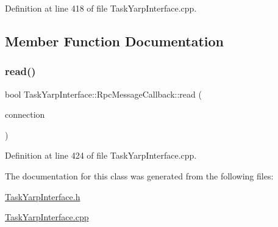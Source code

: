Definition at line 418 of file Task\+Yarp\+Interface.\+cpp.



\subsection{Member Function Documentation}
\hypertarget{classocra_1_1TaskYarpInterface_1_1RpcMessageCallback_a403b0136f2df7ec64af9906560ff113e}{}\label{classocra_1_1TaskYarpInterface_1_1RpcMessageCallback_a403b0136f2df7ec64af9906560ff113e} 
\subsubsection{\texorpdfstring{read()}{read()}}
{\footnotesize\ttfamily bool Task\+Yarp\+Interface\+::\+Rpc\+Message\+Callback\+::read (\begin{DoxyParamCaption}\item[{yarp\+::os\+::\+Connection\+Reader \&}]{connection }\end{DoxyParamCaption})\hspace{0.3cm}{\ttfamily [virtual]}}



Definition at line 424 of file Task\+Yarp\+Interface.\+cpp.



The documentation for this class was generated from the following files\+:\begin{DoxyCompactItemize}
\item 
\hyperlink{TaskYarpInterface_8h}{Task\+Yarp\+Interface.\+h}\item 
\hyperlink{TaskYarpInterface_8cpp}{Task\+Yarp\+Interface.\+cpp}\end{DoxyCompactItemize}
